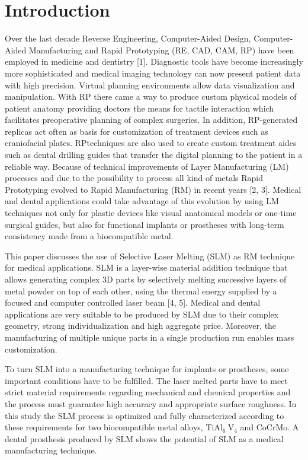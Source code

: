 \documentclass[10pt]{article}
\begin{document}
\section*{Introduction}
Over the last decade Reverse Engineering, Computer-Aided Design, Computer-Aided Manufacturing and Rapid Prototyping (RE, CAD, CAM, RP) have been employed in medicine and dentistry [1]. Diagnostic tools have become increasingly more sophisticated and medical imaging technology can now present patient data with high precision. Virtual planning environments allow data visualization and manipulation. With RP there came a way to produce custom physical models of patient anatomy providing doctors the means for tactile interaction which facilitates preoperative planning of complex surgeries. In addition, RP-generated replicas act often as basis for customization of treatment devices such as craniofacial plates. RPtechniques are also used to create custom treatment aides such as dental drilling guides that transfer the digital planning to the patient in a reliable way. Because of technical improvements of Layer Manufacturing (LM) processes and due to the possibility to process all kind of metals Rapid Prototyping evolved to Rapid Manufacturing (RM) in recent years [2, 3]. Medical and dental applications could take advantage of this evolution by using LM techniques not only for plastic devices like visual anatomical models or one-time surgical guides, but also for functional implants or prostheses with long-term consistency made from a biocompatible metal.

This paper discusses the use of Selective Laser Melting (SLM) as RM technique for medical applications. SLM is a layer-wise material addition technique that allows generating complex 3D parts by selectively melting successive layers of metal powder on top of each other, using the thermal energy supplied by a focused and computer controlled laser beam [4, 5]. Medical and dental applications are very suitable to be produced by SLM due to their complex geometry, strong individualization and high aggregate price. Moreover, the manufacturing of multiple unique parts in a single production run enables mass customization.

To turn SLM into a manufacturing technique for implants or prostheses, some important conditions have to be fulfilled. The laser melted parts have to meet strict material requirements regarding mechanical and chemical properties and the process must guarantee high accuracy and appropriate surface roughness. In this study the SLM process is optimized and fully characterized according to these requirements for two biocompatible metal alloys, $\mathrm{TiAl}_{6} \mathrm{~V}_{4}$ and CoCrMo. A dental prosthesis produced by SLM shows the potential of SLM as a medical manufacturing technique.
\end{document}
